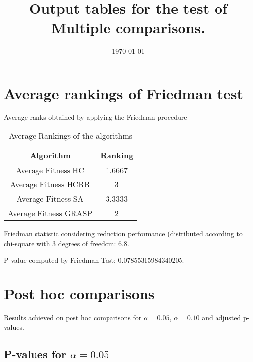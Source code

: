 \documentclass[a4paper,10pt]{article}
\title{Output tables for the test of Multiple comparisons.}
\author{}
\date{\today}
\begin{document}
\begin{landscape}
\pagestyle{empty}
\maketitle
\thispagestyle{empty}
\section{Average rankings of Friedman test}



Average ranks obtained by applying the Friedman procedure

\begin{table}[!htp]
\centering
\begin{tabular}{|c|c|}\hline
Algorithm&Ranking\\\hline
Average Fitness HC     & 1.6667\\
Average Fitness HCRR    & 3\\
Average Fitness SA   & 3.3333\\
Average Fitness GRASP & 2\\
\hline
\end{tabular}
\caption{Average Rankings of the algorithms}
\end{table}

Friedman statistic considering reduction performance (distributed according to chi-square with 3 degrees of freedom: 6.8.

P-value computed by Friedman Test: 0.07855315984340205.\newline



\pagebreak

\section{Post hoc comparisons}

Results achieved on post hoc comparisons for $\alpha = 0.05$, $\alpha = 0.10$ and adjusted p-values.

\subsection{P-values for $\alpha=0.05$}


\end{landscape}
\end{document}
